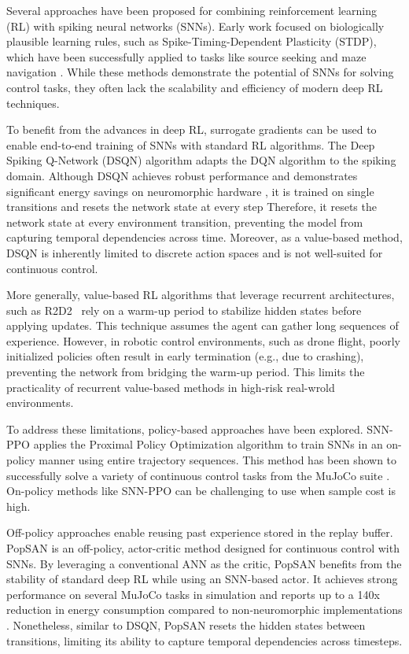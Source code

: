Several approaches have been proposed for combining reinforcement learning (RL) with spiking neural networks (SNNs). Early work focused on biologically plausible learning rules, such as Spike-Timing-Dependent Plasticity (STDP), which have been successfully applied to tasks like source seeking \cite{Florian2005} and maze navigation \cite{fremaux2013spiking}. While these methods demonstrate the potential of SNNs for solving control tasks, they often lack the scalability and efficiency of modern deep RL techniques. 

To benefit from the advances in deep RL, surrogate gradients can be used to enable end-to-end training of SNNs with standard RL algorithms. The Deep Spiking Q-Network (DSQN) algorithm \cite{Chen2022} adapts the DQN algorithm \cite{mnih2013playingatarideepreinforcement} to the spiking domain. Although DSQN achieves robust performance and demonstrates significant energy savings on neuromorphic hardware \cite{akl2021porting}, it is trained on single transitions and resets the network state at every step Therefore, it resets the network state at every environment transition, preventing the model from capturing temporal dependencies across time. Moreover, as a value-based method, DSQN is inherently limited to discrete action spaces and is not well-suited for continuous control.

More generally, value-based RL algorithms that leverage recurrent architectures, such as R2D2~\cite{Kapturowski2019} rely on a warm-up period to stabilize hidden states before applying updates. This technique assumes the agent can gather long sequences of experience. However, in robotic control environments, such as drone flight, poorly initialized policies often result in early termination (e.g., due to crashing), preventing the network from bridging the warm-up period. This limits the practicality of recurrent value-based methods in high-risk real-wrold environments.

To address these limitations, policy-based approaches have been explored. SNN-PPO \cite{zanatta2024exploring} applies the Proximal Policy Optimization algorithm to train SNNs in an on-policy manner using entire trajectory sequences. This method has been shown to successfully solve a variety of continuous control tasks from the MuJoCo suite \cite{mujoco}. On-policy methods like SNN-PPO can be challenging to use when sample cost is high. 

Off-policy approaches enable reusing past experience stored in the replay buffer. PopSAN \cite{Tang2020} is an off-policy, actor-critic method designed for continuous control with SNNs. By leveraging a conventional ANN as the critic, PopSAN benefits from the stability of standard deep RL while using an SNN-based actor. It achieves strong performance on several MuJoCo tasks in simulation and reports up to a 140x reduction in energy consumption compared to non-neuromorphic implementations \cite{Tang2020_Hardware}. Nonetheless, similar to DSQN, PopSAN resets the hidden states between transitions, limiting its ability to capture temporal dependencies across timesteps.

